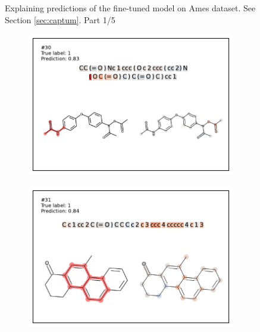 \begin{figure}
\begin{subfigure}[b]{0.33\textwidth}
\end{subfigure} 
\caption{Explaining predictions of the fine-tuned model on Ames dataset. See Section \ref{sec:captum}. Part 1/5}
\label{fig:captum-ames-1}
\end{figure}

\begin{figure}
\centering
\begin{subfigure}[b]{0.33\textwidth} 
  \centering 
  \includegraphics[width=\textwidth]{figures/ames/ames30.pdf} 
\end{subfigure}\begin{subfigure}[b]{0.33\textwidth} 
  \centering 
  \includegraphics[width=\textwidth]{figures/ames/ames31.pdf} 
\end{subfigure}\begin{subfigure}[b]{0.33\textwidth} 
  \centering 

\end{subfigure}
\end{figure}
